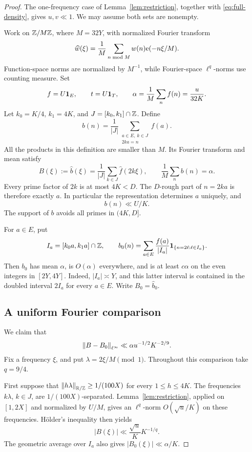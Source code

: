 \begin{proof}
The one-frequency case of Lemma~\ref{lem:restriction}, together
with \eqref{eq:full-density}, gives \(u,v\ll1\). We may
assume both sets are nonempty.

Work on \(\mathbb Z/M\mathbb Z\), where \(M=32Y\), with normalized Fourier
transform
\[
 \widehat w(\xi)=\frac1M\sum_{n\bmod M}w(n)\mathrm e(-n\xi/M).
\]
Function-space norms are normalized by \(M^{-1}\), while
Fourier-space \(\ell^q\)-norms use counting measure.
Set
\[
 f=U\mathbf 1_E,\qquad t=U\mathbf 1_T,\qquad
 \alpha=\frac1M\sum_n f(n)=\frac{u}{32K}.
\]
Let \(k_0=K/4\), \(k_1=4K\), and \(J=[k_0,k_1]\cap\mathbb Z\).
Define
\[
 b(n)=\frac1{|J|}
       \sum_{\substack{a\in E,\ k\in J\\2ka=n}}f(a).
\]
All the products in this definition are smaller than \(M\).
Its Fourier transform and mean satisfy
\[
 B(\xi):=\widehat b(\xi)
     =\frac1{|J|}\sum_{k\in J}\widehat f(2k\xi),
 \qquad \frac1M\sum_n b(n)=\alpha.
\]
Every prime factor of \(2k\) is at most \(4K<D\). The
\(D\)-rough part of \(n=2ka\) is therefore exactly \(a\).
In particular the representation determines \(a\) uniquely, and
\begin{equation}\label{eq:b-pointwise}
 b(n)\ll U/K.
\end{equation}
The support of \(b\) avoids all primes in \((4K,D]\).

For \(a\in E\), put
\[
 I_a=[k_0a,k_1a]\cap\mathbb Z,\qquad
 b_0(n)=\sum_{a\in E}\frac{f(a)}{|I_a|}
              \mathbf 1_{\{n=2\ell:\ell\in I_a\}}.
\]
Then \(b_0\) has mean \(\alpha\), is \(O(\alpha)\) everywhere,
and is at least \(c\alpha\) on the even integers in
\([2Y,4Y]\). Indeed, \(|I_a|\asymp Y\), and this latter
interval is contained in the doubled interval \(2I_a\) for
every \(a\in E\). Write \(B_0=\widehat b_0\).

\subsection*{A uniform Fourier comparison}
We claim that
\begin{equation}\label{eq:fourier-comparison}
 \left\lVert B-B_0\right\rVert_{\ell^\infty}
       \ll\alpha u^{-1/2}K^{-2/9}.
\end{equation}
Fix a frequency \(\xi\), and put \(\lambda=2\xi/M\pmod1\).
Throughout this comparison take \(q=9/4\).

First suppose that
\(\left\lVert h\lambda\right\rVert_{\mathbb R/\mathbb Z}\ge1/(100X)\) for every
\(1\le h\le4K\). The frequencies \(k\lambda\), \(k\in J\),
are \(1/(100X)\)-separated. Lemma~\ref{lem:restriction},
applied on \([1,2X]\) and normalized by \(U/M\), gives an
\(\ell^q\)-norm \(O(\sqrt u/K)\) on these frequencies.
H\"older's inequality then yields
\[
 |B(\xi)|\ll\frac{\sqrt u}{K}K^{-1/q}.
\]
The geometric average over \(I_a\) also gives
\(|B_0(\xi)|\ll\alpha/K\).


\end{proof}
